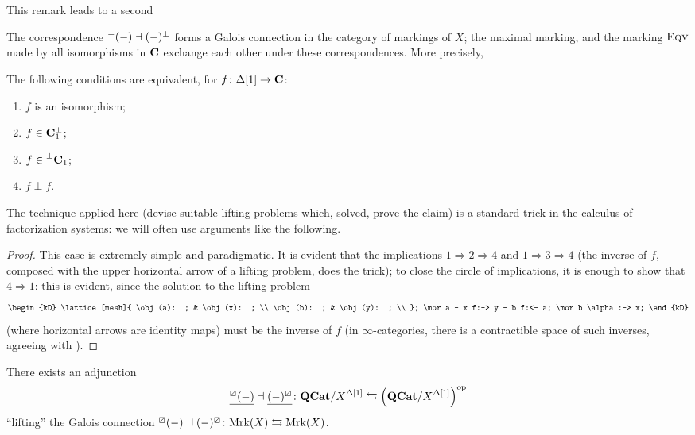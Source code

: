 This remark leads to a second
\begin{remark}
The correspondence $\prescript{\perp}{}(-)\dashv (-)^\perp$ forms a Galois connection in the category of markings of $X$; the maximal marking, and the marking $\text{\scshape Eqv}$ made by all isomorphisms in $\mathbf{C}$ exchange each other under these correspondences. More precisely,
\end{remark}
\begin{proposition}\label{prop:iso.are.ortho.to.all}
The following conditions are equivalent, for $f\colon \Delta[1]\to \mathbf{C}$:
\begin{enumerate}
\item $f$ is an isomorphism;
\item $f\in \mathbf{C}_1^\perp$;
\item $f\in \prescript{\perp}{}{\mathbf{C}_1}$;
\item $f\perp f$.
\end{enumerate}
\begin{remark}
The technique applied here (devise suitable lifting problems which, solved, prove the claim) is a standard trick in the calculus of factorization systems: we will often use arguments like the following. 
\end{remark}
\begin{proof}
This case is extremely simple and paradigmatic. It is evident that the implications $1 \Rightarrow 2 \Rightarrow 4$ and $1 \Rightarrow 3 \Rightarrow 4$ (the inverse of $f$, composed with the upper horizontal arrow of a lifting problem, does the trick); to close the circle of implications, it is enough to show that $4 \Rightarrow 1$: this is evident, since the solution to the lifting problem
\[
\begin{kD}
\lattice[mesh]{
	\obj (a): ; & \obj (x): ; \\
	\obj (b): ; & \obj (y): ; \\
};
\mor a - x f:-> y - b f:<- a;
\mor b \alpha:-> x;
\end{kD}
\]
(where horizontal arrows are identity maps) must be the inverse of $f$ (in $\infty$\hyp{}categories, there is a contractible space of such inverses, agreeing with \adef {}).
\end{proof}
\end{proposition}
\begin{proposition}
There exists an adjunction  \[\underline{{}^\boxslash(-)}\dashv \underline{(-)^\boxslash}\colon \mathbf{QCat}/X^{\Delta[1]}\leftrightarrows\left(\mathbf{QCat}
/X^{\Delta[1]}\right)^{\text{op}} 
\]
``lifting'' the Galois connection ${}^\boxslash(-)\dashv (-)^\boxslash\colon \text{Mrk}(X)\leftrightarrows \text{Mrk}(X)$.\end{proposition}
